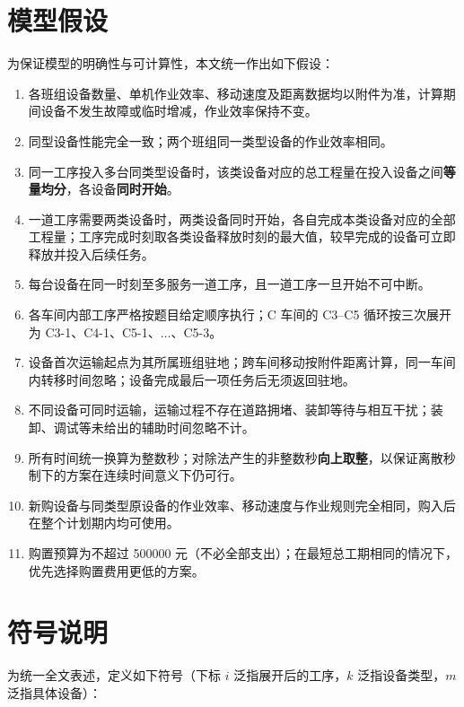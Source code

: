 \documentclass[12pt,a4paper]{article}
\begin{document}
\section{模型假设}

为保证模型的明确性与可计算性，本文统一作出如下假设：

\begin{enumerate}[label=\textbf{假设\,\arabic*：},leftmargin=1.6em]
  \item 各班组设备数量、单机作业效率、移动速度及距离数据均以附件为准，计算期间设备不发生故障或临时增减，作业效率保持不变。
  \item 同型设备性能完全一致；两个班组同一类型设备的作业效率相同。
  \item 同一工序投入多台同类型设备时，该类设备对应的总工程量在投入设备之间\textbf{等量均分}，各设备\textbf{同时开始}。
  \item 一道工序需要两类设备时，两类设备同时开始，各自完成本类设备对应的全部工程量；工序完成时刻取各类设备释放时刻的最大值，较早完成的设备可立即释放并投入后续任务。
  \item 每台设备在同一时刻至多服务一道工序，且一道工序一旦开始不可中断。
  \item 各车间内部工序严格按题目给定顺序执行；C 车间的 C3--C5 循环按三次展开为 C3-1、C4-1、C5-1、$\dots$、C5-3。
  \item 设备首次运输起点为其所属班组驻地；跨车间移动按附件距离计算，同一车间内转移时间忽略；设备完成最后一项任务后无须返回驻地。
  \item 不同设备可同时运输，运输过程不存在道路拥堵、装卸等待与相互干扰；装卸、调试等未给出的辅助时间忽略不计。
  \item 所有时间统一换算为整数秒；对除法产生的非整数秒\textbf{向上取整}，以保证离散秒制下的方案在连续时间意义下仍可行。
  \item 新购设备与同类型原设备的作业效率、移动速度与作业规则完全相同，购入后在整个计划期内均可使用。
  \item 购置预算为不超过 500000 元（不必全部支出）；在最短总工期相同的情况下，优先选择购置费用更低的方案。
\end{enumerate}

\section{符号说明}

为统一全文表述，定义如下符号（下标 $i$ 泛指展开后的工序，$k$ 泛指设备类型，$m$ 泛指具体设备）：
\end{document}
